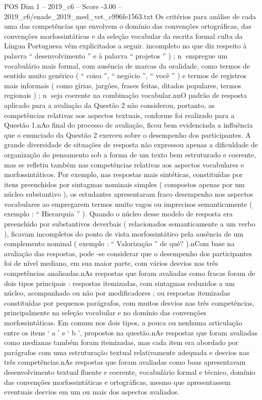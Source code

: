 \begin{textsample}{POS Dim 1 – 2019\_c6 – Score -3.00 – 2019\_c6/enade\_2019\_med\_vet\_c996fe1563.txt}
Os critérios para análise de cada uma das competências que envolvem o domínio das convenções ortográficas, das convenções morfossintáticas e da seleção vocabular da escrita formal culta da Língua Portuguesa vêm explicitados a seguir. incompleto no que diz respeito à palavra “ desenvolvimento ” e à palavra “ projetos ” ) ; n empregue um vocabulário mais formal, com ausência de marcas da oralidade, como termos de sentido muito genérico ( “ coisa ”, “ negócio ”, “ você ” ) e termos de registros mais informais ( como gírias, jargões, frases feitas, ditados populares, termos regionais ) ; n seja coerente na combinação vocabular.nnO padrão de resposta aplicado para a avaliação da Questão 2 não considerou, portanto, as competências relativas aos aspectos textuais, conforme foi realizado para a Questão 1.nAo final do processo de avaliação, ficou bem evidenciada a influência que o enunciado da Questão 2 exerceu sobre o desempenho dos participantes.
A grande diversidade de situações de resposta não expressou apenas a dificuldade de organização do pensamento sob a forma de um texto bem estruturado e coerente, mas se refletiu também nas competências relativas aos aspectos vocabulares e morfossintáticos.
Por exemplo, nas respostas mais sintéticas, constituídas por itens preenchidos por sintagmas nominais simples ( compostos apenas por um núcleo substantivo ), os estudantes apresentaram fraco desempenho nos aspectos vocabulares ao empregarem termos muito vagos ou imprecisos semanticamente ( exemplo : “ Hierarquia ” ).
Quando o núcleo desse modelo de resposta era preenchido por substantivos deverbais ( relacionados semanticamente a um verbo ), ficavam incompletos do ponto de vista morfossintático pela ausência de um complemento nominal ( exemplo : “ Valorização ” de quê? ).nCom base na avaliação das respostas, pode -se considerar que o desempenho dos participantes foi de nível mediano, em sua maior parte, com vários desvios nas três competências analisadas.nAs respostas que foram avaliadas como fracas foram de dois tipos principais : respostas itemizadas, com sintagmas reduzidos a um núcleo, acompanhado ou não por modificadores ; ou respostas itemizadas constituídas por pequenos parágrafos, com muitos desvios nas três competências, principalmente na seleção vocabular e no domínio das convenções morfossintáticas.
Em comum nos dois tipos, a pouca ou nenhuma articulação entre os itens ‘ a ’ e ‘ b ’, propostos na questão.nAs respostas que foram avaliadas como medianas também foram itemizadas, mas cada item era abordado por parágrafos com uma estruturação textual relativamente adequada e desvios nas três competências.nAs respostas que foram avaliadas como boas apresentavam desenvolvimento textual fluente e coerente, vocabulário formal e técnico, domínio das convenções morfossintáticas e ortográficas, mesmo que apresentassem eventuais desvios em um ou mais dos aspectos avaliados.

\end{textsample}
